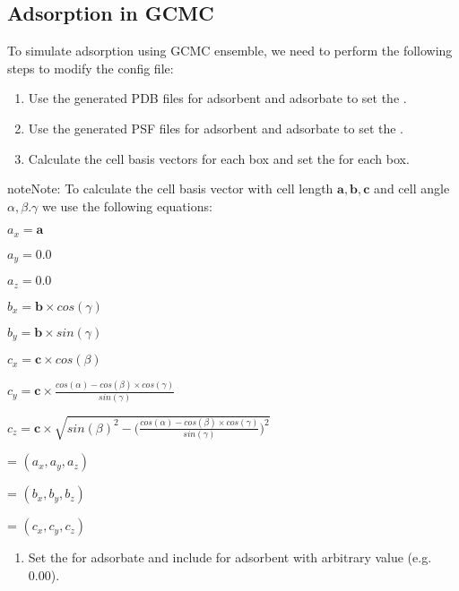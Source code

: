 \documentclass[letterpaper,10pt,english]{sphinxmanual}
\begin{document}
\subsection{Adsorption in GCMC}
\label{\detokenize{howto:adsorption-in-gcmc}}
To simulate adsorption using GCMC ensemble, we need to perform the following steps to modify the config file:
\begin{enumerate}
%
\item {} 
Use the generated PDB files for adsorbent and adsorbate to set the .

\item {} 
Use the generated PSF files for adsorbent and adsorbate to set the .

\item {} 
Calculate the cell basis vectors for each box and set the  for each box.

\end{enumerate}

\begin{sphinxadmonition}{note}{Note:}
To calculate the cell basis vector with cell length \(\boldsymbol{a} , \boldsymbol{b}, \boldsymbol{c}\) and cell angle
\(\alpha, \beta. \gamma\) we use the following equations:

\(a_x = \boldsymbol{a}\)

\(a_y = 0.0\)

\(a_z = 0.0\)

\(b_x = \boldsymbol{b} \times cos(\gamma)\)

\(b_y = \boldsymbol{b} \times sin(\gamma)\)

\(c_x = \boldsymbol{c} \times cos(\beta)\)

\(c_y = \boldsymbol{c} \times \frac{ cos(\alpha) - cos(\beta) \times cos(\gamma) } { sin(\gamma) }\)

\(c_z = \boldsymbol{c} \times \sqrt {{sin(\beta)}^2 - { \bigg(\frac{ cos(\alpha) - cos(\beta) \times cos(\gamma) } { sin(\gamma) }} \bigg)^2}\)

 = \((a_x , a_y, a_z)\)

 = \((b_x , b_y, b_z)\)

 = \((c_x , c_y, c_z)\)
\end{sphinxadmonition}
\begin{enumerate}
%
\setcounter{enumi}{3}
\item {} 
Set the  for adsorbate and include  for adsorbent with arbitrary value (e.g. 0.00).

\end{enumerate}
\end{document}
